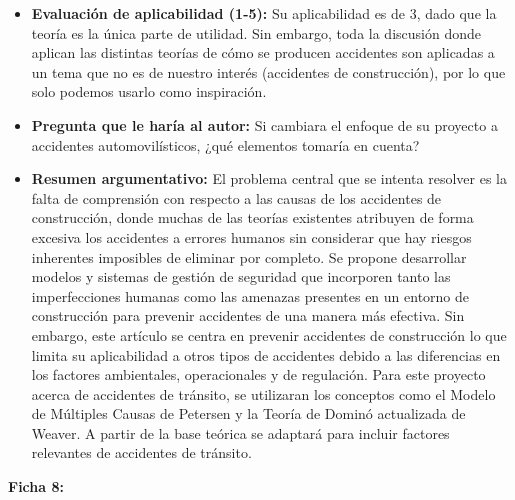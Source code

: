 \documentclass[12pt]{article}
\begin{document}
\begin{itemize}
	\item \textbf{Evaluación de aplicabilidad (1-5):} Su aplicabilidad es de 3, dado 
	que la teoría es la única parte de utilidad. Sin embargo, toda la discusión 
	donde aplican las distintas teorías de cómo se producen accidentes son aplicadas 
	a un tema que no es de nuestro interés (accidentes de construcción), por lo 
	que solo podemos usarlo como inspiración.  
	
	\item \textbf{Pregunta que le haría al autor:}  Si cambiara el enfoque de su 
	proyecto a accidentes automovilísticos, ¿qué elementos tomaría en cuenta? 
	
	\item \textbf{Resumen argumentativo:} El problema central que se intenta 
	resolver es la falta de comprensión con respecto a las causas de los accidentes
	de construcción, donde muchas de las teorías existentes atribuyen de forma 
	excesiva los accidentes a errores humanos sin considerar que hay riesgos 
	inherentes imposibles de eliminar por completo. Se propone desarrollar 
	modelos y sistemas de gestión de seguridad que incorporen tanto las 
	imperfecciones humanas como las amenazas presentes en un entorno de construcción 
	para prevenir accidentes de una manera más efectiva. Sin embargo, este artículo 
	se centra en prevenir accidentes de construcción lo que limita su aplicabilidad
	a otros tipos de accidentes debido a las diferencias en los factores ambientales, 
	operacionales y de regulación. Para este proyecto acerca de accidentes de tránsito, 
	se utilizaran los conceptos como el Modelo de Múltiples Causas de Petersen y 
	la Teoría de Dominó actualizada de Weaver. A partir de la base teórica se adaptará 
	para incluir factores relevantes de accidentes de tránsito. 
	\end{itemize}
	
\textbf{Ficha 8:}
\end{document}
